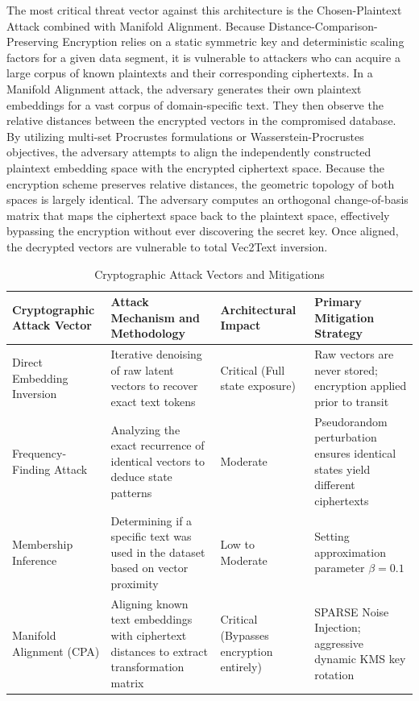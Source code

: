 \documentclass[12pt]{article}
\begin{document}
The most critical threat vector against this architecture is the Chosen-Plaintext Attack combined with Manifold Alignment. Because Distance-Comparison-Preserving Encryption relies on a static symmetric key and deterministic scaling factors for a given data segment, it is vulnerable to attackers who can acquire a large corpus of known plaintexts and their corresponding ciphertexts. In a Manifold Alignment attack, the adversary generates their own plaintext embeddings for a vast corpus of domain-specific text. They then observe the relative distances between the encrypted vectors in the compromised database. By utilizing multi-set Procrustes formulations or Wasserstein-Procrustes objectives, the adversary attempts to align the independently constructed plaintext embedding space with the encrypted ciphertext space. Because the encryption scheme preserves relative distances, the geometric topology of both spaces is largely identical. The adversary computes an orthogonal change-of-basis matrix that maps the ciphertext space back to the plaintext space, effectively bypassing the encryption without ever discovering the secret key. Once aligned, the decrypted vectors are vulnerable to total Vec2Text inversion.

\begin{table}[h]
\centering
\begin{tabular}{|l|l|l|l|}
\hline
\textbf{Cryptographic Attack Vector} & \textbf{Attack Mechanism and Methodology} & \textbf{Architectural Impact} & \textbf{Primary Mitigation Strategy} \\
\hline
Direct Embedding Inversion & Iterative denoising of raw latent vectors to recover exact text tokens & Critical (Full state exposure) & Raw vectors are never stored; encryption applied prior to transit \\
Frequency-Finding Attack & Analyzing the exact recurrence of identical vectors to deduce state patterns & Moderate & Pseudorandom perturbation ensures identical states yield different ciphertexts \\
Membership Inference & Determining if a specific text was used in the dataset based on vector proximity & Low to Moderate & Setting approximation parameter $\beta = 0.1$ \\
Manifold Alignment (CPA) & Aligning known text embeddings with ciphertext distances to extract transformation matrix & Critical (Bypasses encryption entirely) & SPARSE Noise Injection; aggressive dynamic KMS key rotation \\
\hline
\end{tabular}
\caption{Cryptographic Attack Vectors and Mitigations}
\end{table}
\end{document}
